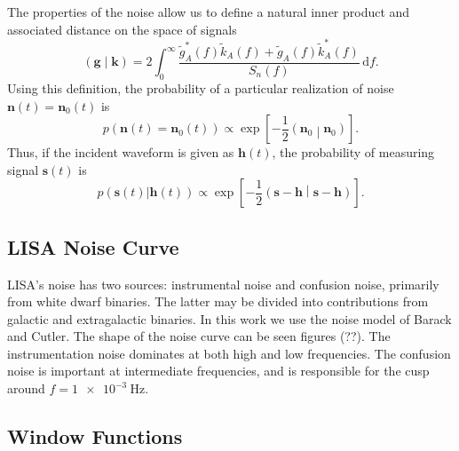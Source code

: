 \documentclass[a4paper, 11pt, titlepage, twoside]{report}
\newcommand{\recip}[1]{\ensuremath{\frac{1}{#1}}}
\newcommand{\innerprod}[2]{\ensuremath{\left({#1}\middle|{#2}\right)}}
\newcommand{\dd}{\ensuremath{\mathrm{d}}}
\newcommand{\intd}[4]{\ensuremath{\int_{#1}^{#2}{#3}\,\dd{#4}}}
\begin{document}
{The properties of the noise allow us to define a natural inner product and associated distance on the space of signals\cite{Cutler1994}
\begin{equation}
\innerprod{\boldsymbol{g}}{\boldsymbol{k}} = 2\intd{0}{\infty}{\frac{\tilde{g}_A^*(f)\tilde{k}_A(f) + \tilde{g}_A(f)\tilde{k}_A^*(f)}{S_n(f)}}{f}.
\end{equation}
Using this definition, the probability of a particular realization of noise $\boldsymbol{n}(t) = \boldsymbol{n}_0(t)$ is
\begin{equation}
p(\boldsymbol{n}(t) = \boldsymbol{n}_0(t)) \propto \exp\left[-\recip{2}\innerprod{\boldsymbol{n}_0}{\boldsymbol{n}_0}\right].
\end{equation}
Thus, if the incident waveform is given as $\boldsymbol{h}(t)$, the probability of measuring signal $\boldsymbol{s}(t)$ is
\begin{equation}
p(\boldsymbol{s}(t)|\boldsymbol{h}(t)) \propto \exp\left[-\recip{2}\innerprod{\boldsymbol{s}-\boldsymbol{h}}{\boldsymbol{s}-\boldsymbol{h}}\right].
\label{eq:sig_prob}
\end{equation}

\subsection{LISA Noise Curve}\label{sec:Noise}

LISA's noise has two sources: instrumental noise and confusion noise, primarily from white dwarf binaries. The latter may be divided into contributions from galactic and extragalactic binaries. In this work we use the noise model of Barack and Cutler\cite{Barack2004}. The shape of the noise curve can be seen figures (??). The instrumentation noise dominates at both high and low frequencies. The confusion noise is important at intermediate frequencies, and is responsible for the cusp around $f = \SI{1e-3}{\Hz}$.

\subsection{Window Functions}

}
\end{document}
